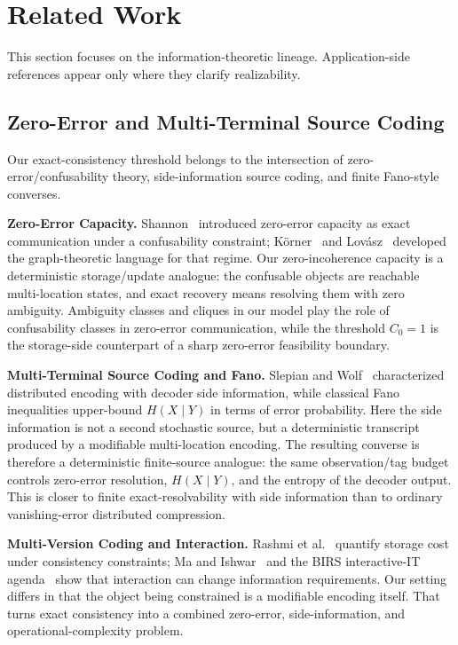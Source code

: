 \section{Related Work}\label{sec:related}

This section focuses on the information-theoretic lineage. Application-side references appear only where they clarify realizability.

\subsection{Zero-Error and Multi-Terminal Source Coding}\label{sec:related-source-coding}

Our exact-consistency threshold belongs to the intersection of zero-error/confusability theory, side-information source coding, and finite Fano-style converses.

\textbf{Zero-Error Capacity.} Shannon~\cite{shannon1956zero} introduced zero-error capacity as exact communication under a confusability constraint; Körner~\cite{korner1973graphs} and Lovász~\cite{lovasz1979shannon} developed the graph-theoretic language for that regime. Our zero-incoherence capacity is a deterministic storage/update analogue: the confusable objects are reachable multi-location states, and exact recovery means resolving them with zero ambiguity. Ambiguity classes and cliques in our model play the role of confusability classes in zero-error communication, while the threshold $C_0=1$ is the storage-side counterpart of a sharp zero-error feasibility boundary.

\textbf{Multi-Terminal Source Coding and Fano.} Slepian and Wolf~\cite{slepian1973noiseless} characterized distributed encoding with decoder side information, while classical Fano inequalities upper-bound $H(X\mid Y)$ in terms of error probability. Here the side information is not a second stochastic source, but a deterministic transcript produced by a modifiable multi-location encoding. The resulting converse is therefore a deterministic finite-source analogue: the same observation/tag budget controls zero-error resolution, $H(X\mid Y)$, and the entropy of the decoder output. This is closer to finite exact-resolvability with side information than to ordinary vanishing-error distributed compression.

\textbf{Multi-Version Coding and Interaction.} Rashmi et al.~\cite{rashmi2015multiversion} quantify storage cost under consistency constraints; Ma and Ishwar~\cite{ma2011distributed} and the BIRS interactive-IT agenda~\cite{birs2012interactive} show that interaction can change information requirements. Our setting differs in that the object being constrained is a modifiable encoding itself. That turns exact consistency into a combined zero-error, side-information, and operational-complexity problem.

